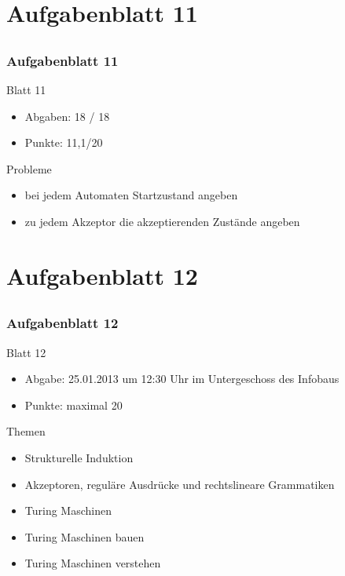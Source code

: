 

\section[Blatt 11]{Aufgabenblatt 11}
\subsection*{}
\begin{frame}
	\frametitle{Aufgabenblatt 11}
	\begin{block}{Blatt 11}
		\begin{itemize}
			\item Abgaben: 18 / 18
			\item Punkte: 11,1/20
		\end{itemize}
   \end{block}
	\begin{block}{Probleme}
 		\begin{itemize}
		   \item bei jedem Automaten Startzustand angeben \pause
		   \item zu jedem Akzeptor die akzeptierenden Zustände angeben
 	  \end{itemize}
	\end{block}
\end{frame}

\section[Blatt 12]{Aufgabenblatt 12}
\subsection*{}
\begin{frame}
	\frametitle{Aufgabenblatt 12}
	\begin{block}{Blatt 12}
		\begin{itemize}
			\item Abgabe: 25.01.2013 um 12:30 Uhr im Untergeschoss des Infobaus
			\item Punkte: maximal 20
		\end{itemize}
  	\end{block}
	\begin{block}{Themen}
		\begin{itemize}
	  		\item Strukturelle Induktion \pause
	  		\item Akzeptoren, reguläre Ausdrücke und rechtslineare Grammatiken \pause
	  		\item Turing Maschinen \pause
	  		\item Turing Maschinen bauen\pause 
	  		\item Turing Maschinen verstehen 
	 	\end{itemize}
	\end{block}
\end{frame}
